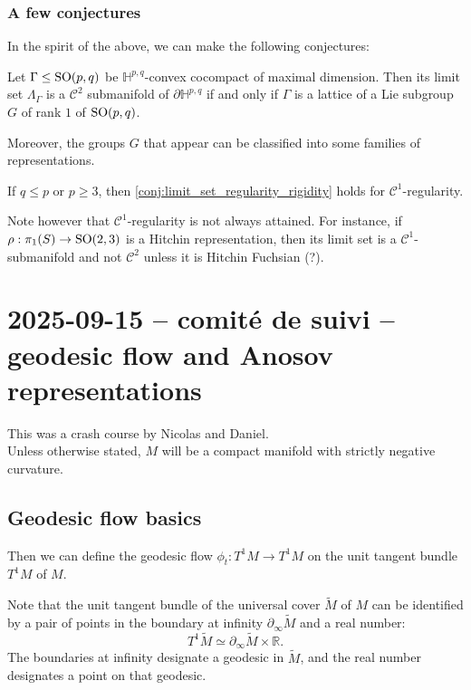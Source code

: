 \documentclass{report}
\begin{document}
\subsubsection{A few conjectures}
In the spirit of the above, we can make the following conjectures:
\begin{conjecture}\label{conj:limit_set_regularity_rigidity}
    Let $\Gamma \leq \operatorname{{\mathrm{SO}}}(p,q)$ be $\mathbb H^{p,q}$-convex cocompact of maximal dimension.
    Then its limit set $\Lambda_\Gamma$ is a $\mathcal C^2$ submanifold of $\partial \mathbb H^{p,q}$ if and only if $\Gamma$ is a lattice of a Lie subgroup $G$ of rank $1$ of $\operatorname{{\mathrm{SO}}}(p,q)$.

    Moreover, the groups $G$ that appear can be classified into some families of representations.
\end{conjecture}
\begin{conjecture}
    If $q \leq p$ or $p \geq 3$, then \cref{conj:limit_set_regularity_rigidity} holds for $\mathcal C^1$-regularity.
\end{conjecture}
Note however that $\mathcal C^1$-regularity is not always attained.
For instance, if $\rho: \pi_1(S) \to \operatorname{{\mathrm{SO}}}(2,3)$ is a Hitchin representation, then its limit set is a $\mathcal C^1$-submanifold and not $\mathcal C^2$ unless it is Hitchin Fuchsian (?).

\section{2025-09-15 -- comité de suivi -- geodesic flow and Anosov representations}
This was a crash course by Nicolas and Daniel.\\
Unless otherwise stated, $M$ will be a compact manifold with strictly negative curvature.

\subsection{Geodesic flow basics}
Then we can define the geodesic flow $\phi_t: T^1 M \to T^1 M$ on the unit tangent bundle $T^1 M$ of $M$.

Note that the unit tangent bundle of the universal cover $\widetilde M$ of $M$ can be identified by a pair of points in the boundary at infinity $\partial_\infty \widetilde M$ and a real number:
\[
T^1 \widetilde M \simeq \partial_\infty \widetilde M \times \mathbb R.
\]
The boundaries at infinity designate a geodesic in $\widetilde M$, and the real number designates a point on that geodesic.
\end{document}
